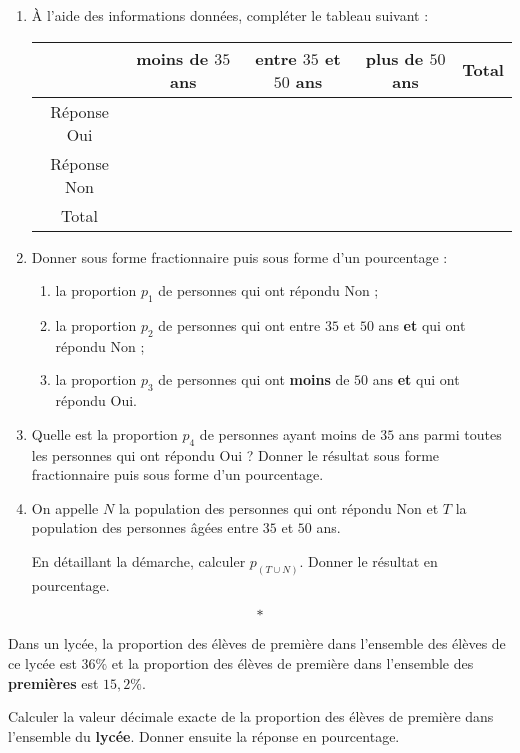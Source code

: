 \documentclass[10pt,french]{article}
\begin{document}
\begin{enumerate}
    \item À l'aide des informations données, compléter le tableau suivant :
    \begin{center}
    \renewcommand\arraystretch{1.25}
        \begin{tabular}{|c|c|c|c|c|}
            \hline
                & moins de $35$ ans & entre $35$ et $50$ ans & plus de $50$ ans & Total \\
            \hline
                Réponse Oui & & & & \\
            \hline
                Réponse Non & & && \\
            \hline
                Total & & & & \\
            \hline
        \end{tabular}
    \renewcommand\arraystretch{1}
    \end{center}
    
    \item Donner sous forme fractionnaire puis sous forme d'un pourcentage :
        \begin{enumerate}
            \item la proportion $p_1$ de personnes qui ont répondu Non ;
            \item la proportion $p_2$ de personnes qui ont entre $35$ et $50$ ans \textbf{et} qui ont répondu Non ;
            \item  la proportion $p_3$ de personnes qui ont \textbf{moins} de $50$ ans \textbf{et} qui ont répondu Oui.
        \end{enumerate}
    \item Quelle est la proportion $p_4$ de personnes ayant moins de $35$ ans parmi toutes les personnes qui ont répondu Oui ?
    Donner le résultat sous forme fractionnaire puis sous forme d'un pourcentage.
    \item On appelle $N$ la population des personnes qui ont répondu Non et $T$ la population des personnes âgées entre $35$ et $50$ ans.\par
    En détaillant la démarche, calculer $p_{(T \cup N)}$. Donner le résultat en pourcentage.
\end{enumerate}\[*\]

\exo Dans un lycée, la proportion des élèves de première dans l'ensemble des élèves de ce lycée est $36\%$ et la proportion des élèves de première \stmg{} dans l'ensemble des \textbf{premières} est $15,2\%$.\par
Calculer la valeur décimale exacte de la proportion des élèves de première \stmg{} dans l'ensemble du \textbf{lycée}. Donner ensuite la réponse en pourcentage.
\end{document}
